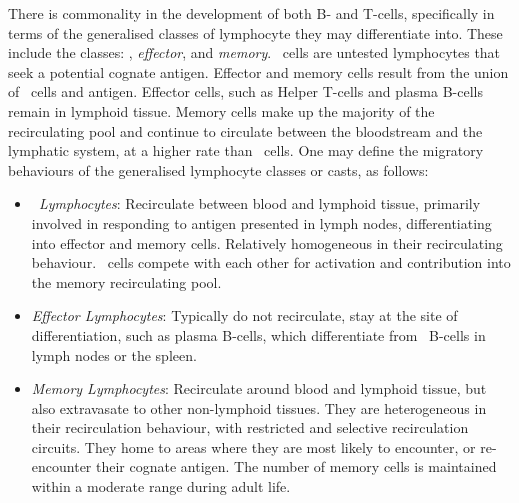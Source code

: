 There is commonality in the development of both B- and T-cells, specifically in terms of the generalised classes of lymphocyte they may differentiate into. These include the classes: \emph{\naive}, \emph{effector}, and \emph{memory}. \Naive\ cells are untested lymphocytes that seek a potential cognate antigen. Effector and memory cells result from the union of \naive\ cells and antigen. Effector cells, such as Helper T-cells and plasma B-cells remain in lymphoid tissue. Memory cells make up the majority of the recirculating pool and continue to circulate between the bloodstream and the lymphatic system, at a higher rate than \naive\ cells. One may define the migratory behaviours of the generalised lymphocyte classes or casts, as follows:

\begin{itemize}
	\item \emph{\Naive\ Lymphocytes}: Recirculate between blood and lymphoid tissue, primarily involved in responding to antigen presented in lymph nodes, differentiating into effector and memory cells. Relatively homogeneous in their recirculating behaviour. \Naive\ cells compete with each other for activation and contribution into the memory recirculating pool.
	\item \emph{Effector Lymphocytes}: Typically do not recirculate, stay at the site of differentiation, such as plasma B-cells, which differentiate from \naive\ B-cells in lymph nodes or the spleen.
	\item \emph{Memory Lymphocytes}: Recirculate around blood and lymphoid tissue, but also extravasate to other non-lymphoid tissues. They are heterogeneous in their recirculation behaviour, with restricted and selective recirculation circuits. They home to areas where they are most likely to encounter, or re-encounter their cognate antigen. The number of memory cells is maintained within a moderate range during adult life.
\end{itemize}

%
%
